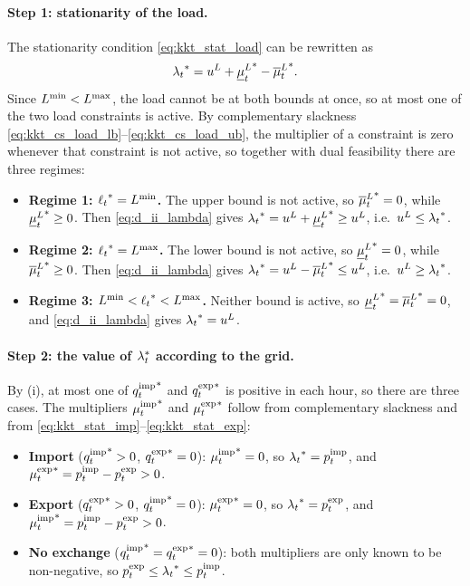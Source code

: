 \paragraph{Step 1: stationarity of the load.}
The stationarity condition \eqref{eq:kkt_stat_load} can be rewritten as
\begin{equation}
    {\lambda_{t}}^* = u^{L} + {\underline{\mu}^{L}_{t}}^* - {\overline{\mu}^{L}_{t}}^*.
    \label{eq:d_ii_lambda}
\end{equation}
Since $L^{\min} < L^{\max}$, the load cannot be at both bounds at once, so at most one of the two
load constraints is active. By complementary slackness
\eqref{eq:kkt_cs_load_lb}--\eqref{eq:kkt_cs_load_ub}, the multiplier of a constraint is zero
whenever that constraint is not active, so together with dual feasibility there are three
regimes:
\begin{itemize}
    \item \textbf{Regime 1: ${\ell_{t}}^* = L^{\min}$.} The upper bound is not active, so
    ${\overline{\mu}^{L}_{t}}^* = 0$, while ${\underline{\mu}^{L}_{t}}^* \geq 0$. Then \eqref{eq:d_ii_lambda} gives
    ${\lambda_{t}}^* = u^{L} + {\underline{\mu}^{L}_{t}}^* \geq u^{L}$, i.e.\ $u^{L} \leq {\lambda_{t}}^*$.
    \item \textbf{Regime 2: ${\ell_{t}}^* = L^{\max}$.} The lower bound is not active, so
    ${\underline{\mu}^{L}_{t}}^* = 0$, while ${\overline{\mu}^{L}_{t}}^* \geq 0$. Then \eqref{eq:d_ii_lambda} gives
    ${\lambda_{t}}^* = u^{L} - {\overline{\mu}^{L}_{t}}^* \leq u^{L}$, i.e.\ $u^{L} \geq {\lambda_{t}}^*$.
    \item \textbf{Regime 3: $L^{\min} < {\ell_{t}}^* < L^{\max}$.} Neither bound is active, so
    ${\underline{\mu}^{L}_{t}}^* = {\overline{\mu}^{L}_{t}}^* = 0$, and \eqref{eq:d_ii_lambda} gives ${\lambda_{t}}^* = u^{L}$.
\end{itemize}

\paragraph{Step 2: the value of $\lambda_{t}^*$ according to the grid.}
By (i), at most one of ${q^{\mathrm{imp}}_{t}}^*$ and ${q^{\mathrm{exp}}_{t}}^*$ is positive in each hour, so there are three
cases. The multipliers ${\mu^{\mathrm{imp}}_{t}}^*$ and ${\mu^{\mathrm{exp}}_{t}}^*$ follow from complementary slackness and
from \eqref{eq:kkt_stat_imp}--\eqref{eq:kkt_stat_exp}:
\begin{itemize}
    \item \textbf{Import} (${q^{\mathrm{imp}}_{t}}^* > 0$, ${q^{\mathrm{exp}}_{t}}^* = 0$): ${\mu^{\mathrm{imp}}_{t}}^* = 0$, so
    ${\lambda_{t}}^* = p^{\mathrm{imp}}_{t}$, and ${\mu^{\mathrm{exp}}_{t}}^* = p^{\mathrm{imp}}_{t} - p^{\mathrm{exp}}_{t} > 0$.
    \item \textbf{Export} (${q^{\mathrm{exp}}_{t}}^* > 0$, ${q^{\mathrm{imp}}_{t}}^* = 0$): ${\mu^{\mathrm{exp}}_{t}}^* = 0$, so
    ${\lambda_{t}}^* = p^{\mathrm{exp}}_{t}$, and ${\mu^{\mathrm{imp}}_{t}}^* = p^{\mathrm{imp}}_{t} - p^{\mathrm{exp}}_{t} > 0$.
    \item \textbf{No exchange} (${q^{\mathrm{imp}}_{t}}^* = {q^{\mathrm{exp}}_{t}}^* = 0$): both multipliers are only known
    to be non-negative, so $p^{\mathrm{exp}}_{t} \leq {\lambda_{t}}^* \leq p^{\mathrm{imp}}_{t}$.
\end{itemize}

